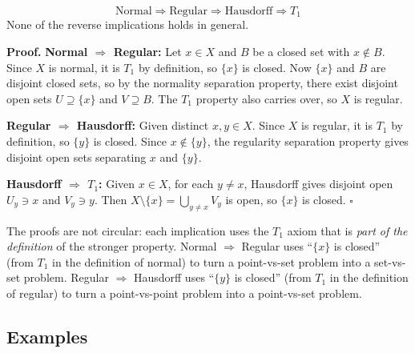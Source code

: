 \documentclass[11pt]{report}
\renewenvironment{proof}[1][Proof]{\noindent\textbf{#1.} }{\hfill$\square$\par\vspace{5pt}}
\begin{document}
\begin{thmbox}
\[
\text{Normal} \Rightarrow \text{Regular} \Rightarrow \text{Hausdorff} \Rightarrow T_1
\]
None of the reverse implications holds in general.
\end{thmbox}

\begin{proof}
\textbf{Normal $\Rightarrow$ Regular:} Let $x \in X$ and $B$ be a closed set with $x \notin B$. Since $X$ is normal, it is $T_1$ by definition, so $\{x\}$ is closed. Now $\{x\}$ and $B$ are disjoint closed sets, so by the normality separation property, there exist disjoint open sets $U \supseteq \{x\}$ and $V \supseteq B$. The $T_1$ property also carries over, so $X$ is regular.

\textbf{Regular $\Rightarrow$ Hausdorff:} Given distinct $x, y \in X$. Since $X$ is regular, it is $T_1$ by definition, so $\{y\}$ is closed. Since $x \notin \{y\}$, the regularity separation property gives disjoint open sets separating $x$ and $\{y\}$.

\textbf{Hausdorff $\Rightarrow$ $T_1$:} Given $x \in X$, for each $y \neq x$, Hausdorff gives disjoint open $U_y \ni x$ and $V_y \ni y$. Then $X \setminus \{x\} = \bigcup_{y \neq x} V_y$ is open, so $\{x\}$ is closed.
\end{proof}

\begin{rembox}
The proofs are not circular: each implication uses the $T_1$ axiom that is \emph{part of the definition} of the stronger property. Normal $\Rightarrow$ Regular uses ``$\{x\}$ is closed'' (from $T_1$ in the definition of normal) to turn a point-vs-set problem into a set-vs-set problem. Regular $\Rightarrow$ Hausdorff uses ``$\{y\}$ is closed'' (from $T_1$ in the definition of regular) to turn a point-vs-point problem into a point-vs-set problem.
\end{rembox}

\subsection{Examples}
\end{document}
